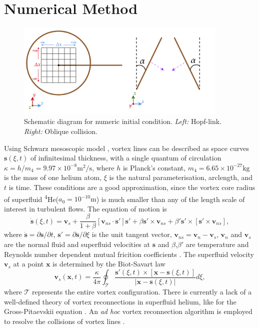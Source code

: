 \documentclass[%
superscriptaddress,
 amsmath,amssymb,
prl,
prb,
]{revtex4-2}
\def \s{\mathbf{s}}
\def \v{\mathbf{v}}
\def \x{\mathbf{x}}
\begin{document}
\section{Numerical Method}

\begin{figure}
	\centering
	\includegraphics[width=0.9\textwidth]{init-cond-schem.png}
	\caption{Schematic diagram for numeric initial condition. \emph{Left:} Hopf-link. \emph{Right:} Oblique collision.}
\end{figure}
Using Schwarz mesoscopic model \cite{schwarzThreedimensionalVortexDynamics1988a}, vortex lines can be described as space curves $\s(\xi,t)$ of infinitesimal thickness, with a single quantum of circulation $\kappa=h/m_4=9.97\times10^{-8}\text{m}^2/\text{s}$, where $h$ is Planck's constant, $m_4=6.65\times10^{-27}\text{kg}$ is the mass of one helium atom, $\xi$ is the natural parameterisation, arclength, and $t$ is time. These conditions are a good approximation, since the vortex core radius of superfluid \textsuperscript{4}He($a_0=10^{-10}\text{m}$) is much smaller than any of the length scale of interest in turbulent flows. The equation of motion is
\begin{equation}
	\dot{\s}(\xi,t) = \v_s + \frac{\beta}{1+\beta}\left[\v_{ns}\cdot \s'\right]\s' + \beta\s'\times\v_{ns}+\beta'\s'\times\left[\s'\times \v_{ns}\right],
\end{equation}
where $\dot{\s}=\partial\s/\partial t$, $\s'=\partial\s/\partial \xi$ is the unit tangent vector, $\v_{ns}=\v_n - \v_s$, $\v_n$ and $\v_s$ are the normal fluid and superfluid velocities at $\s$ and $\beta$,$\beta'$ are temperature and Reynolds number dependent mutual fricition coefficients \cite{galantucciNewSelfconsistentApproach2020b}. The superfluid velocity $\v_s$ at a point $\x$ is determined by the Biot-Savart law
\begin{equation}
	\v_s(\x,t) = \frac{\kappa}{4\pi}\oint_{\mathcal{T}}\frac{\s'(\xi,t)\times\left[\x-\s(\xi,t)\right]}{|\x-\s(\xi,t)|}d\xi,
\end{equation}
where $\mathcal{T}$ represents the entire vortex configuration.
There is currently a lack of a well-defined theory of vortex reconnections in superfluid helium, like for the Gross-Pitaevskii equation \cite{villoisIrreversibleDynamicsVortex2020,villoisUniversalNonuniversalAspects2017a,promentMatchingTheoryCharacterize2020a}. An \emph{ad hoc} vortex reconnection algorithm is employed to resolve the collisions of vortex lines \cite{baggaleySensitivityVortexFilament2012a}.
\end{document}
